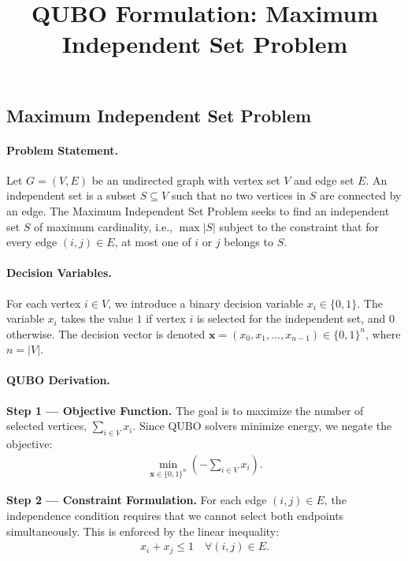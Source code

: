 \documentclass[12pt]{article}
\title{QUBO Formulation: Maximum Independent Set Problem}
\date{}
\begin{document}
\maketitle

\subsection*{Maximum Independent Set Problem}

\paragraph{Problem Statement.}
Let $G=(V,E)$ be an undirected graph with vertex set $V$ and edge set $E$. An independent set is a subset $S \subseteq V$ such that no two vertices in $S$ are connected by an edge. The Maximum Independent Set Problem seeks to find an independent set $S$ of maximum cardinality, i.e., $\max |S|$ subject to the constraint that for every edge $(i,j) \in E$, at most one of $i$ or $j$ belongs to $S$.

\paragraph{Decision Variables.}
For each vertex $i \in V$, we introduce a binary decision variable $x_i \in \{0,1\}$. The variable $x_i$ takes the value $1$ if vertex $i$ is selected for the independent set, and $0$ otherwise. The decision vector is denoted $\mathbf{x} = (x_0, x_1, \dots, x_{n-1}) \in \{0,1\}^n$, where $n = |V|$.

\paragraph{QUBO Derivation.}
\textbf{Step 1 --- Objective Function.} The goal is to maximize the number of selected vertices, $\sum_{i \in V} x_i$. Since QUBO solvers minimize energy, we negate the objective:
\begin{align}
\min_{\mathbf{x} \in \{0,1\}^n} \left( -\sum_{i \in V} x_i \right).
\end{align}

\textbf{Step 2 --- Constraint Formulation.} For each edge $(i,j) \in E$, the independence condition requires that we cannot select both endpoints simultaneously. This is enforced by the linear inequality:
\begin{align}
x_i + x_j \le 1 \quad \forall (i,j) \in E.
\end{align}
\end{document}

